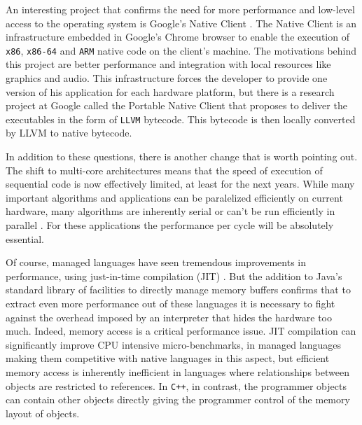 An interesting project that confirms the need for more performance and low-level access to the operating system is Google's Native Client \cite{NaCl}.
The Native Client is an infrastructure embedded in Google's Chrome browser to enable the execution of \texttt{x86}, \texttt{x86-64} and \texttt{ARM}
native code on the client's machine. The motivations behind this project are better performance and integration with local resources like graphics and audio. This infrastructure
forces the developer to provide one version of his application for each hardware platform, but there is a research project at Google called the Portable
Native Client \cite{pNaCl} that proposes to deliver the executables in the form of \texttt{LLVM} bytecode. This bytecode is then locally converted by LLVM to native bytecode.

In addition to these questions, there is another change that is worth pointing out. The shift to multi-core architectures means that the speed of
execution of sequential code is now effectively limited, at least for the next years. While many important algorithms and applications can be
paralelized efficiently on current hardware, many algorithms are inherently serial or can't be run efficiently in parallel \cite{Madriles}.
For these applications the performance per cycle will be absolutely essential.

Of course, managed languages have seen tremendous improvements in performance, using just-in-time compilation (JIT) \cite{Aycock}. But the
addition to Java's standard library of facilities to directly manage memory buffers confirms that to extract even more performance out of
these languages it is necessary to fight against the overhead imposed by an interpreter that hides the hardware too much.
Indeed, memory access is a critical performance issue. JIT compilation can significantly improve CPU intensive micro-benchmarks,
in managed languages making them competitive with native languages in this aspect, but efficient memory access is inherently
inefficient in languages where relationships between objects are restricted to references. In \texttt{C++}, in contrast,
the programmer objects can contain other objects directly giving the programmer control of the memory layout of objects.


